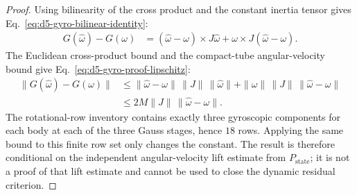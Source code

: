 \documentclass[preprint,12pt]{elsarticle}
\begin{document}
\begin{proof}
Using bilinearity of the cross product and the constant inertia tensor gives
Eq.~\eqref{eq:d5-gyro-bilinear-identity}:
\begin{equation}
\label{eq:d5-gyro-bilinear-identity}
\begin{aligned}
G(\widehat\omega)-G(\omega)
  &=(\widehat\omega-\omega)\times J\widehat\omega
   +\omega\times J(\widehat\omega-\omega).
\end{aligned}
\end{equation}
The Euclidean cross-product bound and the compact-tube angular-velocity bound
give Eq.~\eqref{eq:d5-gyro-proof-lipschitz}:
\begin{equation}
\label{eq:d5-gyro-proof-lipschitz}
\begin{aligned}
\|G(\widehat\omega)-G(\omega)\|
&\le \|\widehat\omega-\omega\|\,\|J\|\,\|\widehat\omega\|
   +\|\omega\|\,\|J\|\,\|\widehat\omega-\omega\|\\
&\le 2M\|J\|\,\|\widehat\omega-\omega\|.
\end{aligned}
\end{equation}
The rotational-row inventory contains exactly three gyroscopic components for
each body at each of the three Gauss stages, hence \(18\) rows.  Applying the
same bound to this finite row set only changes the constant.  The result is
therefore conditional on the independent angular-velocity lift estimate from
\(P_{\mathrm{state}}\); it is not a proof of that lift estimate and cannot be
used to close the dynamic residual criterion.
\end{proof}
\end{document}
